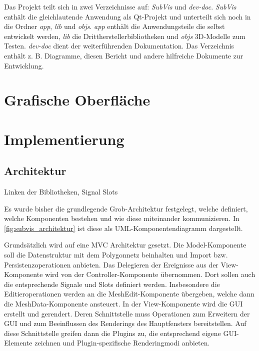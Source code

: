 Das Projekt teilt sich in zwei Verzeichnisse auf: \emph{SubVis} und \emph{dev-doc}.
\emph{SubVis} enthält die gleichlautende Anwendung als Qt-Projekt und unterteilt sich noch in die Ordner \emph{app}, \emph{lib} und \emph{objs}.
\emph{app} enthält die Anwendungsteile die selbst entwickelt werden,
\emph{lib} die Drittherstellerbibliotheken und \emph{objs} 3D-Modelle zum Testen.
\emph{dev-doc} dient der weiterführenden Dokumentation.
Das Verzeichnis enthält z. B. Diagramme, diesen Bericht und andere hilfreiche Dokumente zur Entwicklung.


\section{Grafische Oberfläche}

\section{Implementierung}

\subsection{Architektur}

Linken der Bibliotheken, Signal Slots

Es wurde bisher die grundlegende Grob-Architektur festgelegt, welche definiert, welche Komponenten bestehen und wie diese miteinander kommunizieren.
In \autoref{fig:subvis_architektur} ist diese als UML-Komponentendiagramm dargestellt.

Grundsätzlich wird auf eine MVC Architektur gesetzt.
Die Model-Komponente soll die Datenstruktur mit dem Polygonnetz beinhalten und Import bzw. Persistenzoperationen anbieten.
Das Delegieren der Ereignisse aus der View-Komponente wird von der Controller-Komponente übernommen. 
Dort sollen auch die entsprechende Signale und Slots definiert werden.
Insbesondere die Editieroperationen werden an die MeshEdit-Komponente übergeben, welche dann die MeshData-Komponente ansteuert.
In der View-Komponente wird die GUI erstellt und gerendert. 
Deren Schnittstelle muss Operationen zum Erweitern der GUI und zum Beeinflussen des Renderings des Hauptfensters bereitstellen.
Auf diese Schnittstelle greifen dann die Plugins zu, die entsprechend eigene GUI-Elemente zeichnen und Plugin-spezifische Renderingmodi anbieten.

